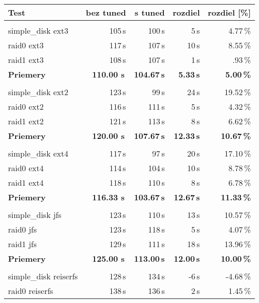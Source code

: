 \begin{table}[H]
\begin{center}
\begin{tabular}{|l|r r r r|}
    \hline
    \textbf{Test} & \textbf{bez tuned} & \textbf{s tuned} & \textbf{rozdiel} & \textbf{rozdiel [\%]} \\
    \hline & \\[-1em]\hline
    simple\_disk ext3 & 105\,s & 100\,s & 5\,s & 4.77\,\% \\
    raid0 ext3 & 117\,s & 107\,s & 10\,s & 8.55\,\% \\
    raid1 ext3 & 108\,s & 107\,s & 1\,s & .93\,\% \\
    \hline
    \textbf{Priemery} & \textbf{110.00 s}\,& \textbf{104.67\,s} & \textbf{5.33\,s} & \textbf{5.00\,\%} \\
    \hline & \\[-1em]\hline
    simple\_disk ext2 & 123\,s & 99\,s & 24\,s & 19.52\,\% \\
    raid0 ext2 & 116\,s & 111\,s & 5\,s & 4.32\,\% \\
    raid1 ext2 & 121\,s & 113\,s & 8\,s & 6.62\,\% \\
    \hline
    \textbf{Priemery} & \textbf{120.00 s}\,& \textbf{107.67\,s} & \textbf{12.33\,s} & \textbf{10.67\,\%} \\
    \hline & \\[-1em]\hline
    simple\_disk ext4 & 117\,s & 97\,s & 20\,s & 17.10\,\% \\
    raid0 ext4 & 114\,s & 104\,s & 10\,s & 8.78\,\% \\
    raid1 ext4 & 118\,s & 110\,s & 8\,s & 6.78\,\% \\
    \hline
    \textbf{Priemery} & \textbf{116.33 s}\,& \textbf{103.67\,s} & \textbf{12.67\,s} & \textbf{11.33\,\%} \\
    \hline & \\[-1em]\hline
    simple\_disk jfs & 123\,s & 110\,s & 13\,s & 10.57\,\% \\
    raid0 jfs & 123\,s & 118\,s & 5\,s & 4.07\,\% \\
    raid1 jfs & 129\,s & 111\,s & 18\,s & 13.96\,\% \\
    \hline
    \textbf{Priemery} & \textbf{125.00 s}\,& \textbf{113.00\,s} & \textbf{12.00\,s} & \textbf{10.00\,\%} \\
    \hline & \\[-1em]\hline
    simple\_disk reiserfs & 128\,s & 134\,s & -6\,s & -4.68\,\% \\
    raid0 reiserfs & 138\,s & 136\,s & 2\,s & 1.45\,\% \\

\end{tabular}
\end{center}
\end{table}
